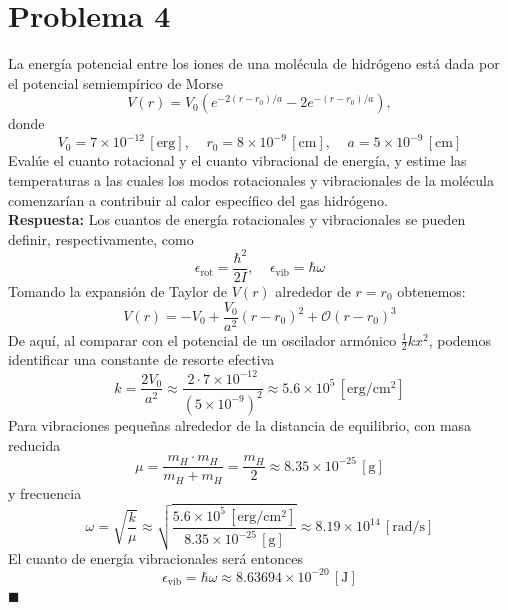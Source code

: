 \documentclass[]{article}
\numberwithin{equation}{section}
\newcommand{\0}{\textcolor{gray}{0}}
\newcommand{\qed}{\hfill\(\blacksquare\)}
\begin{document}
\section{Problema 4}
La energía potencial entre los iones de una molécula de hidrógeno está dada por el potencial semiempírico de Morse
\begin{equation}
	V(r) = V_0 \left(e^{-2(r - r_0)/a} - 2 e^{-(r - r_0)/a}\right),
\end{equation}
donde
\begin{equation*}
	V_0 = 7\times 10^{-12} \, \mathrm{[erg]}, ~~~~~ r_0 = 8 \times 10^{-9} \, \mathrm{[cm]}, ~~~~~ a = 5 \times 10^{-9} \, \mathrm{[cm]}
\end{equation*}
Evalúe el cuanto rotacional y el cuanto vibracional de energía, y estime las temperaturas a las cuales los modos rotacionales y vibracionales de la molécula comenzarían a contribuir al calor específico del gas hidrógeno.
\\

\textbf{Respuesta:} Los cuantos de energía rotacionales y vibracionales se pueden definir, respectivamente, como
\begin{equation}
	\epsilon_{\mathrm{rot}} = \frac{\hbar^2}{2 I}, ~~~~~ \epsilon_{\mathrm{vib}} = \hbar \omega
\end{equation}
Tomando la expansión de Taylor de $V(r)$ alrededor de $r = r_0$ obtenemos:
\begin{equation}
	V(r) = -V_0 + \frac{V_0}{a^2}(r - r_0)^2 + \mathcal{O}\left(r-r_0\right)^3
\end{equation}
De aquí, al comparar con el potencial de un oscilador armónico $\frac{1}{2} k x^2$, podemos identificar una constante de resorte efectiva
\begin{equation}
	k = \frac{2 V_0}{a^2} \approx \frac{2 \cdot 7\times 10^{-12}}{\left(5 \times 10^{-9}\right)^2} \approx 5.6 \times 10^5 \, \mathrm{[erg/cm^2]}
\end{equation}
Para vibraciones pequeñas alrededor de la distancia de equilibrio, con masa reducida
\begin{equation}
	\mu = \frac{m_H \cdot m_H}{m_H + m_H} = \frac{m_H}{2} \approx 8.35 \times 10^{-25} \, \mathrm{[g]}
\end{equation}
y frecuencia
\begin{equation}
	\omega = \sqrt{\frac{k}{\mu}} \approx \sqrt{\frac{5.6 \times 10^5 \, \mathrm{[erg/cm^2]}}{8.35 \times 10^{-25} \, \mathrm{[g]}}} \approx 8.19 \times 10^{14} \, \mathrm{[rad/s]}
\end{equation}
El cuanto de energía vibracionales será entonces
\begin{equation}
	\epsilon_{\mathrm{vib}} = \hbar \omega \approx 8.63694\times 10^{-20} \, \mathrm{[J]}
\end{equation}
\qed
\end{document}
